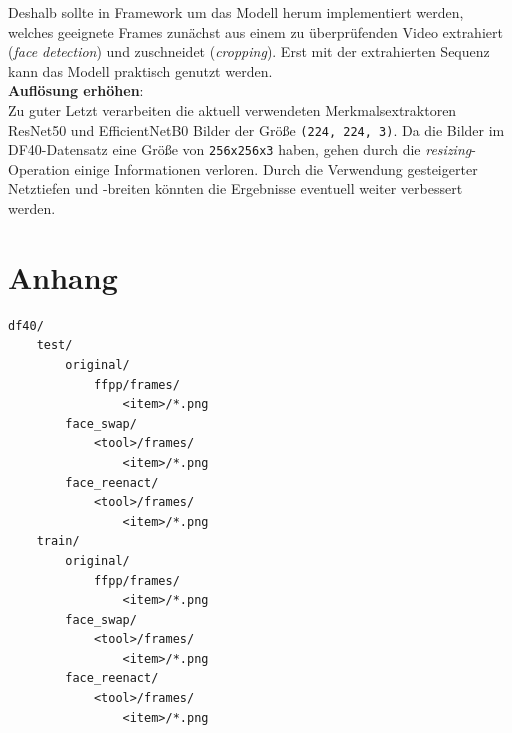 \documentclass{article}
\newcommand{\imgsize}{\texttt{(224, 224, 3)}\xspace}
\newcommand{\resnet}{ResNet50\xspace}
\newcommand{\effnet}{EfficientNetB0\xspace}
\begin{document}
Deshalb sollte in Framework um das Modell herum implementiert werden, welches geeignete Frames zunächst aus einem zu überprüfenden Video extrahiert (\textit{face detection}) und zuschneidet (\textit{cropping}).
Erst mit der extrahierten Sequenz kann das Modell praktisch genutzt werden.
\\[0.5em]
\textbf{Auflösung erhöhen}:\\
Zu guter Letzt verarbeiten die aktuell verwendeten Merkmalsextraktoren \resnet und \effnet Bilder der Größe \imgsize.
Da die Bilder im DF40-Datensatz eine Größe von \texttt{256x256x3} haben, gehen durch die \textit{resizing}-Operation einige Informationen verloren.
Durch die Verwendung gesteigerter Netztiefen und -breiten könnten die Ergebnisse eventuell weiter verbessert werden.

\newpage



\section*{Anhang}
\begin{lstlisting}[label={apx:lst.df40},caption={Ordnerstruktur des DF40-Datensets im \texttt{io/}-Verzeichnis}]
df40/
    test/
        original/
            ffpp/frames/
                <item>/*.png
        face_swap/
            <tool>/frames/
                <item>/*.png
        face_reenact/
            <tool>/frames/
                <item>/*.png
    train/
        original/
            ffpp/frames/
                <item>/*.png
        face_swap/
            <tool>/frames/
                <item>/*.png
        face_reenact/
            <tool>/frames/
                <item>/*.png
\end{lstlisting}
\end{document}
